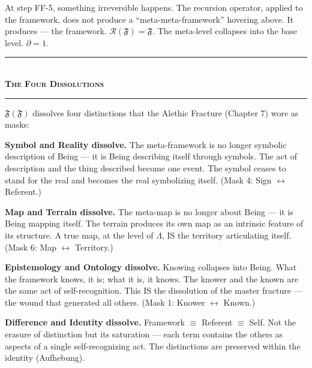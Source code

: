 \documentclass[10pt, openany, oneside]{book}
\renewcommand{\normalsize}{\fontsize{10}{13}\selectfont}
\begin{document}
\vspace{0.8em}

\noindent At step FF-5, something irreversible happens. The recursion operator, applied to the framework, does not produce a ``meta-meta-framework'' hovering above. It produces --- the framework. $\mathcal{R}(\mathfrak{F}) = \mathfrak{F}$. The meta-level collapses into the base level. $\partial = 1$.

\vspace{1.5em}


\begin{center}
    \rule{0.3\textwidth}{0.4pt}\\[0.5em]
    {\normalsize\bfseries\scshape The Four Dissolutions}\\[0.3em]
    \rule{0.3\textwidth}{0.4pt}
\end{center}

\vspace{1em}

\noindent $\mathfrak{F}(\mathfrak{F})$ dissolves four distinctions that the Alethic Fracture (Chapter 7) wore as masks:

\textbf{Symbol and Reality dissolve.} The meta-framework is no longer symbolic description of Being --- it is Being describing itself through symbols. The act of description and the thing described become one event. The symbol ceases to stand for the real and becomes the real symbolizing itself. (Mask 4: Sign $\leftrightarrow$ Referent.)

\textbf{Map and Terrain dissolve.} The meta-map is no longer about Being --- it is Being mapping itself. The terrain produces its own map as an intrinsic feature of its structure. A true map, at the level of $\Lambda$, IS the territory articulating itself. (Mask 6: Map $\leftrightarrow$ Territory.)

\textbf{Epistemology and Ontology dissolve.} Knowing collapses into Being. What the framework knows, it is; what it is, it knows. The knower and the known are the same act of self-recognition. This IS the dissolution of the master fracture --- the wound that generated all others. (Mask 1: Knower $\leftrightarrow$ Known.)

\textbf{Difference and Identity dissolve.} Framework $\equiv$ Referent $\equiv$ Self. Not the erasure of distinction but its saturation --- each term contains the others as aspects of a single self-recognizing act. The distinctions are preserved within the identity (Aufhebung).
\end{document}
